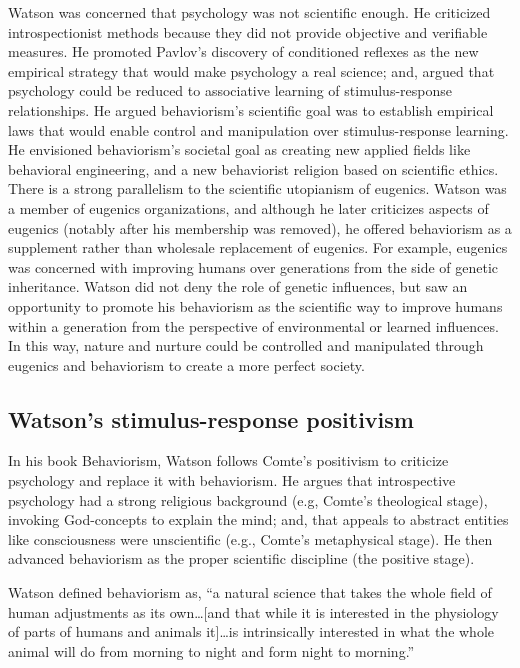 \documentclass[
  oneside,
  12pt]{crumpbook}
\begin{document}
Watson was concerned that psychology was not scientific enough. He criticized introspectionist methods because they did not provide objective and verifiable measures. He promoted Pavlov's discovery of conditioned reflexes as the new empirical strategy that would make psychology a real science; and, argued that psychology could be reduced to associative learning of stimulus-response relationships. He argued behaviorism's scientific goal was to establish empirical laws that would enable control and manipulation over stimulus-response learning. He envisioned behaviorism's societal goal as creating new applied fields like behavioral engineering, and a new behaviorist religion based on scientific ethics. There is a strong parallelism to the scientific utopianism of eugenics. Watson was a member of eugenics organizations, and although he later criticizes aspects of eugenics (notably after his membership was removed), he offered behaviorism as a supplement rather than wholesale replacement of eugenics. For example, eugenics was concerned with improving humans over generations from the side of genetic inheritance. Watson did not deny the role of genetic influences, but saw an opportunity to promote his behaviorism as the scientific way to improve humans within a generation from the perspective of environmental or learned influences. In this way, nature and nurture could be controlled and manipulated through eugenics and behaviorism to create a more perfect society.

\hypertarget{watsons-stimulus-response-positivism}{%
\subsection{Watson's stimulus-response positivism}\label{watsons-stimulus-response-positivism}}

In his book Behaviorism, Watson follows Comte's positivism to criticize psychology and replace it with behaviorism. He argues that introspective psychology had a strong religious background (e.g, Comte's theological stage), invoking God-concepts to explain the mind; and, that appeals to abstract entities like consciousness were unscientific (e.g., Comte's metaphysical stage). He then advanced behaviorism as the proper scientific discipline (the positive stage).

Watson defined behaviorism as, ``a natural science that takes the whole field of human adjustments as its own\ldots{[}and that while it is interested in the physiology of parts of humans and animals it{]}\ldots is intrinsically interested in what the whole animal will do from morning to night and form night to morning.''
\end{document}
